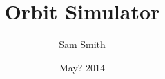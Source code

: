 \documentclass[a4paper,11pt,titlepage]{article}
\author{Sam Smith}
\title{Orbit Simulator}
\date{May? 2014}
\begin{document}
\maketitle
\tableofcontents
\clearpage

\newcommand{\add}[1]{ \clearpage}

\add{analysis}
\add{design}
\add{implementation}
\end{document}
